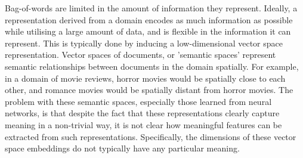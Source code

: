 

Bag-of-words are limited in the amount of information they represent. Ideally, a representation  derived from a domain  encodes as much information  as possible  while utilising a large amount of data, and is flexible in the information it can represent. This is typically done by inducing a low-dimensional vector space representation. Vector spaces of documents, or 'semantic spaces' represent  semantic relationships between documents in the domain  spatially. For example, in a domain of movie reviews, horror movies would be spatially close to each other, and romance movies would be spatially distant from horror movies. The problem with these semantic spaces, especially those learned from neural networks, is that despite the fact that these representations clearly capture meaning in a non-trivial way, it is not clear how meaningful features can be extracted from such representations. Specifically, the dimensions of these vector space embeddings do not typically have any particular meaning.





 
%

